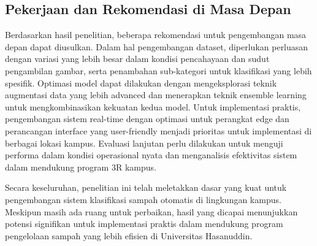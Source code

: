 \documentclass[12pt,a4paper]{article}
\begin{document}
\begin{adjustwidth}{3em}{0pt}
\subsection{Pekerjaan dan Rekomendasi di Masa Depan}
\hspace{0.5cm} Berdasarkan hasil penelitian, beberapa rekomendasi untuk pengembangan masa depan dapat diusulkan. Dalam hal pengembangan dataset, diperlukan perluasan dengan variasi yang lebih besar dalam kondisi pencahayaan dan sudut pengambilan gambar, serta penambahan sub-kategori untuk klasifikasi yang lebih spesifik. Optimasi model dapat dilakukan dengan mengeksplorasi teknik augmentasi data yang lebih advanced dan menerapkan teknik ensemble learning untuk mengkombinasikan kekuatan kedua model. Untuk implementasi praktis, pengembangan sistem real-time dengan optimasi untuk perangkat edge dan perancangan interface yang user-friendly menjadi prioritas untuk implementasi di berbagai lokasi kampus. Evaluasi lanjutan perlu dilakukan untuk menguji performa dalam kondisi operasional nyata dan menganalisis efektivitas sistem dalam mendukung program 3R kampus.

\hspace{0.5cm} Secara keseluruhan, penelitian ini telah meletakkan dasar yang kuat untuk pengembangan sistem klasifikasi sampah otomatis di lingkungan kampus. Meskipun masih ada ruang untuk perbaikan, hasil yang dicapai menunjukkan potensi signifikan untuk implementasi praktis dalam mendukung program pengelolaan sampah yang lebih efisien di Universitas Hasanuddin.

\end{adjustwidth}
\newpage
\end{document}
